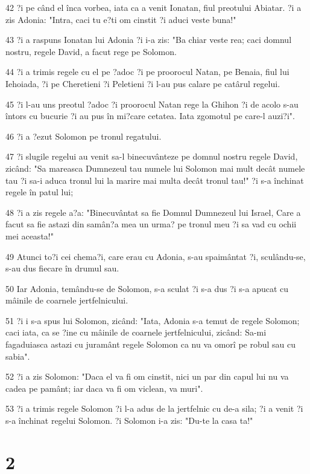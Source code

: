 \par 42 ?i pe când el înca vorbea, iata ca a venit Ionatan, fiul preotului Abiatar. ?i a zis Adonia: "Intra, caci tu e?ti om cinstit ?i aduci veste buna!"
\par 43 ?i a raspuns Ionatan lui Adonia ?i i-a zis: "Ba chiar veste rea; caci domnul nostru, regele David, a facut rege pe Solomon.
\par 44 ?i a trimis regele cu el pe ?adoc ?i pe proorocul Natan, pe Benaia, fiul lui Iehoiada, ?i pe Cheretieni ?i Peletieni ?i l-au pus calare pe catârul regelui.
\par 45 ?i l-au uns preotul ?adoc ?i proorocul Natan rege la Ghihon ?i de acolo s-au întors cu bucurie ?i au pus în mi?care cetatea. Iata zgomotul pe care-l auzi?i".
\par 46 ?i a ?ezut Solomon pe tronul regatului.
\par 47 ?i slugile regelui au venit sa-l binecuvânteze pe domnul nostru regele David, zicând: "Sa mareasca Dumnezeul tau numele lui Solomon mai mult decât numele tau ?i sa-i aduca tronul lui la marire mai multa decât tronul tau!" ?i s-a închinat regele în patul lui;
\par 48 ?i a zis regele a?a: "Binecuvântat sa fie Domnul Dumnezeul lui Israel, Care a facut sa fie astazi din samân?a mea un urma? pe tronul meu ?i sa vad cu ochii mei aceasta!"
\par 49 Atunci to?i cei chema?i, care erau cu Adonia, s-au spaimântat ?i, sculându-se, s-au dus fiecare în drumul sau.
\par 50 Iar Adonia, temându-se de Solomon, s-a sculat ?i s-a dus ?i s-a apucat cu mâinile de coarnele jertfelnicului.
\par 51 ?i i s-a spus lui Solomon, zicând: "Iata, Adonia s-a temut de regele Solomon; caci iata, ca se ?ine cu mâinile de coarnele jertfelnicului, zicând: Sa-mi fagaduiasca astazi cu juramânt regele Solomon ca nu va omorî pe robul sau cu sabia".
\par 52 ?i a zis Solomon: "Daca el va fi om cinstit, nici un par din capul lui nu va cadea pe pamânt; iar daca va fi om viclean, va muri".
\par 53 ?i a trimis regele Solomon ?i l-a adus de la jertfelnic cu de-a sila; ?i a venit ?i s-a închinat regelui Solomon. ?i Solomon i-a zis: "Du-te la casa ta!"

\chapter{2}

